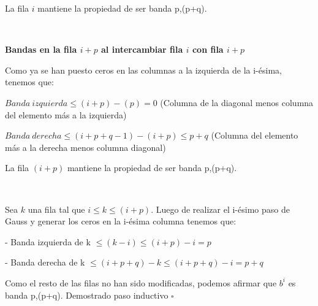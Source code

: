 La fila $i$ mantiene la propiedad de ser banda p,(p+q).

~

\textbf{Bandas en la fila $i+p$ al intercambiar fila $i$ con fila $i+p$}

Como ya se han puesto ceros en las columnas a la izquierda de la i-ésima, tenemos que:

$Banda \ izquierda \leq (i+p) - (p) = 0$ (Columna de la diagonal menos columna del elemento más a la izquierda)

$Banda \ derecha \leq (i+p+q-1) - (i+p) \leq p+q$ (Columna del elemento más a la derecha menos columna diagonal)

La fila $(i+p)$ mantiene la propiedad de ser banda p,(p+q).

~

Sea $k$ una fila tal que $i \leq k \leq (i+p)$. Luego de realizar el i-ésimo paso de Gauss y generar los ceros en la 
i-ésima columna tenemos que:

- Banda izquierda de k $\leq (k-i) \leq (i+p)-i = p$

- Banda derecha de k $ \leq (i+p+q)-k \leq (i+p+q)-i = p+q $

Como el resto de las filas no han sido modificadas, podemos afirmar que $b^{i}$ es banda p,(p+q). 
Demostrado paso inductivo $\square$

























